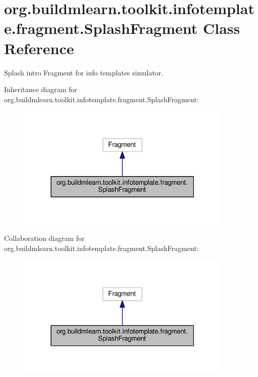\hypertarget{classorg_1_1buildmlearn_1_1toolkit_1_1infotemplate_1_1fragment_1_1SplashFragment}{}\section{org.\+buildmlearn.\+toolkit.\+infotemplate.\+fragment.\+Splash\+Fragment Class Reference}
\label{classorg_1_1buildmlearn_1_1toolkit_1_1infotemplate_1_1fragment_1_1SplashFragment}


Splash intro Fragment for info template\textquotesingle{}s simulator.  




Inheritance diagram for org.\+buildmlearn.\+toolkit.\+infotemplate.\+fragment.\+Splash\+Fragment\+:
\nopagebreak
\begin{figure}[H]
\begin{center}
\leavevmode
\includegraphics[width=292pt]{classorg_1_1buildmlearn_1_1toolkit_1_1infotemplate_1_1fragment_1_1SplashFragment__inherit__graph}
\end{center}
\end{figure}


Collaboration diagram for org.\+buildmlearn.\+toolkit.\+infotemplate.\+fragment.\+Splash\+Fragment\+:
\nopagebreak
\begin{figure}[H]
\begin{center}
\leavevmode
\includegraphics[width=292pt]{classorg_1_1buildmlearn_1_1toolkit_1_1infotemplate_1_1fragment_1_1SplashFragment__coll__graph}
\end{center}
\end{figure}
